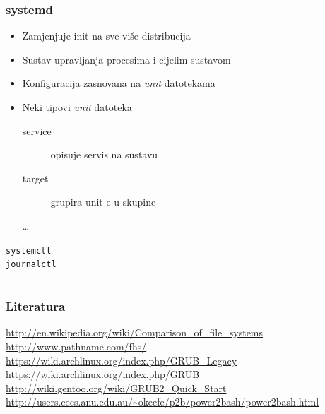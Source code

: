 \documentclass[t]{beamer}
\begin{document}
\begin{frame}
	\frametitle{systemd}
	\begin{itemize}
		\item Zamjenjuje init na sve više distribucija
		\item Sustav upravljanja procesima i cijelim sustavom
	\end{itemize}
	\begin{itemize}
		\item Konfiguracija zasnovana na \emph{unit} datotekama
		\item Neki tipovi \emph{unit} datoteka
		\begin{description}
			\item[service] opisuje servis na sustavu
			\item[target] grupira unit-e u skupine
			\item[\dots]
		\end{description}
	\end{itemize}
	\vfill
	\texttt{systemctl} \\ \texttt{journalctl}
\end{frame}

\section*{}
\begin{frame}
	\frametitle{Literatura}
	\url{http://en.wikipedia.org/wiki/Comparison_of_file_systems}\\
	\url{http://www.pathname.com/fhs/}\\
	\vfill
	\url{https://wiki.archlinux.org/index.php/GRUB_Legacy}\\
	\url{https://wiki.archlinux.org/index.php/GRUB}\\
	\url{http://wiki.gentoo.org/wiki/GRUB2_Quick_Start}\\
	\vfill
	\url{http://users.cecs.anu.edu.au/~okeefe/p2b/power2bash/power2bash.html}\\
\end{frame}
\end{document}
